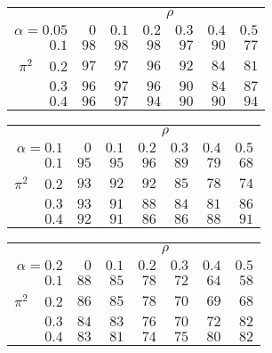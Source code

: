 \begin{tabular}{r|rrrrrr}
\hline\hline
 &\multicolumn{6}{c}{$\rho$} \\ 
 $\alpha = 0.05$ & $0$ & $0.1$ & $0.2$ & $0.3$ & $0.4$ & $0.5$ \\ 
 \hline$0.1$ & $98$ & $98$ & $98$ & $97$ & $90$ & $77$\\ 
$\pi^2\;\;\;$ $0.2$ & $97$ & $97$ & $96$ & $92$ & $84$ & $81$\\ 
$0.3$ & $96$ & $97$ & $96$ & $90$ & $84$ & $87$\\ 
$0.4$ & $96$ & $97$ & $94$ & $90$ & $90$ & $94$\\ 
 \hline 
 \end{tabular}
 
 \vspace{2em} 
 
\begin{tabular}{r|rrrrrr}
\hline\hline
 &\multicolumn{6}{c}{$\rho$} \\ 
 $\alpha = 0.1$ & $0$ & $0.1$ & $0.2$ & $0.3$ & $0.4$ & $0.5$ \\ 
 \hline$0.1$ & $95$ & $95$ & $96$ & $89$ & $79$ & $68$\\ 
$\pi^2\;\;\;$ $0.2$ & $93$ & $92$ & $92$ & $85$ & $78$ & $74$\\ 
$0.3$ & $93$ & $91$ & $88$ & $84$ & $81$ & $86$\\ 
$0.4$ & $92$ & $91$ & $86$ & $86$ & $88$ & $91$\\ 
 \hline 
 \end{tabular}
 
 \vspace{2em} 
 
\begin{tabular}{r|rrrrrr}
\hline\hline
 &\multicolumn{6}{c}{$\rho$} \\ 
 $\alpha = 0.2$ & $0$ & $0.1$ & $0.2$ & $0.3$ & $0.4$ & $0.5$ \\ 
 \hline$0.1$ & $88$ & $85$ & $78$ & $72$ & $64$ & $58$\\ 
$\pi^2\;\;\;$ $0.2$ & $86$ & $85$ & $78$ & $70$ & $69$ & $68$\\ 
$0.3$ & $84$ & $83$ & $76$ & $70$ & $72$ & $82$\\ 
$0.4$ & $83$ & $81$ & $74$ & $75$ & $80$ & $82$\\ 
 \hline 
 \end{tabular}